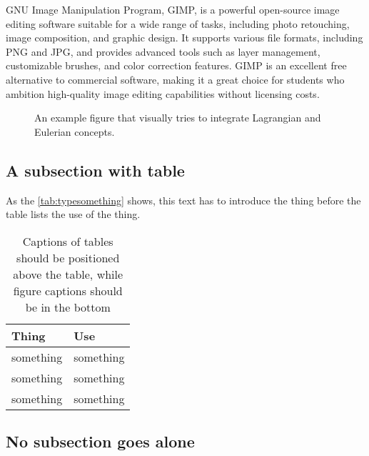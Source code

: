 GNU Image Manipulation Program, GIMP, is a powerful open-source image editing software suitable for a wide range of tasks, including photo retouching, image composition, and graphic design. It supports various file formats, including PNG and JPG, and provides advanced tools such as layer management, customizable brushes, and color correction features. GIMP is an excellent free alternative to commercial software, making it a great choice for students who ambition high-quality image editing capabilities without licensing costs.


\begin{figure}[htp]
	\begin{center}
		\begin{minipage}{\textwidth}
			\centering
			\caption[An example figure.]{An example figure that visually tries to integrate Lagrangian and Eulerian concepts.}
			\label{fig:example}
		\end{minipage}
	\end{center}
\end{figure}

		
\subsection{A subsection with table}
\label{subsec:somesome}
		
As the \autoref{tab:typesomething} shows, this text has to introduce the thing before the table lists the use of the thing.
		
		
\begin{table}[hb] %
	\centering
	\caption{Captions of tables should be positioned above the table, while figure captions should be in the bottom}
	\begin{tabular}{ll}
		\hline
		\textbf{Thing} & \textbf{Use} \\
		\hline
		something & something \\
		something & something \\
		something & something \\
		\hline
	\end{tabular}
	\label{tab:typesomething}
\end{table}
		
\subsection{No subsection goes alone}
\label{subsec:somenoth}

